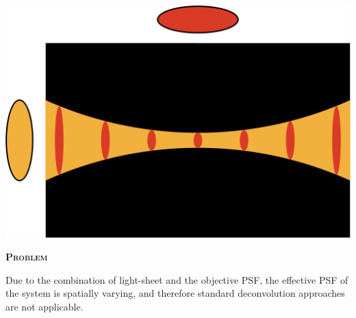 \documentclass[a0paper,portrait,fontscale=0.35]{baposter}
\newcommand{\mycaption}[1]{
  {
    \smaller
    \emph{#1}
  }
}
\theoremstyle{plain}
\theoremstyle{plain}
\theoremstyle{definition}
\theoremstyle{plain}
\theoremstyle{definition}
\begin{document}
\begin{poster}
{\begin{minipage}[t]{\textwidth}
\begin{minipage}[t]{0.48\textwidth}
      \begin{minipage}[t]{\textwidth}
        \centering
        \includegraphics[width=\textwidth]{img/psf_4.png}

      \end{minipage}

      \begin{center}
        \larger
        {\color{red}\textbf{\textsc{Problem}}}\\
      \end{center}
      \vspace{-0.5em}
      \begin{tcolorbox}[colback=red!10!white,colframe=red]
        Due to the combination of light-sheet and the objective PSF, 
        the effective PSF of the system is spatially varying, and
        therefore standard deconvolution approaches are not applicable.
      \end{tcolorbox}

    \end{minipage}
  \end{minipage}
}
\end{poster}
\end{document}
